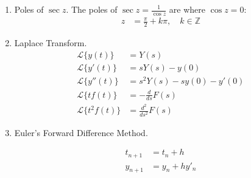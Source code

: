 \begin{enumerate}[label=\thesubsection.\arabic*, ref=\thesubsection.\theenumi]
\begin{align}
\\
&= \begin{cases} 2\pi \j, & n = -1 \\ 0, & n \ne -1 \end{cases}
\end{align}
\item Poles of $\sec z$. The poles of $\sec z = \frac{1}{\cos z}$ are where $\cos z = 0$:
\begin{align}
z &= \frac{\pi}{2} + k\pi, \quad k \in \mathbb{Z}
\label{eq:F-sec}
\end{align}
\item Laplace Transform.
\begin{align}
\mathcal{L}\{y(t)\} &= Y(s)
\\
\mathcal{L}\{y'(t)\} &= sY(s)-y(0)
\\
\mathcal{L}\{y''(t)\} &= s^2Y(s)-sy(0)-y'(0)
\\
\mathcal{L}\{t f(t)\} &= -\frac{d}{ds}F(s)
\\
\mathcal{L}\{t^2 f(t)\} &= \frac{d^2}{ds^2}F(s)
\label{eq:F-laplace}
\end{align}
\item Euler's Forward Difference Method.

\begin{align}
t_{n+1} &= t_n+h \\
y_{n+1} &= y_n+h y'_n
\label{eq:F-euler}
\end{align}

\end{enumerate}
